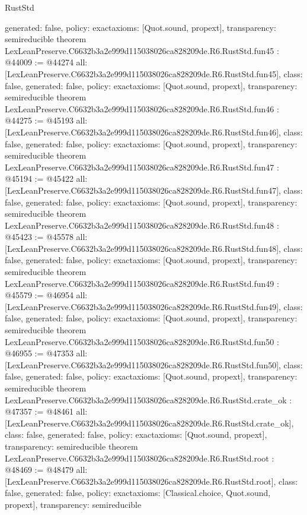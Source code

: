 \begin{lexlean}{RustStd}
\begin{coremodule}
{  generated: false,
  policy: exact{axioms: [Quot.sound, propext]},
  transparency: semireducible
}
theorem LexLeanPreserve.C6632b3a2e999d115038026ca828209de.R6.RustStd.fun45 : @44009 := @44274 {
  all: [LexLeanPreserve.C6632b3a2e999d115038026ca828209de.R6.RustStd.fun45],
  class: false,
  generated: false,
  policy: exact{axioms: [Quot.sound, propext]},
  transparency: semireducible
}
theorem LexLeanPreserve.C6632b3a2e999d115038026ca828209de.R6.RustStd.fun46 : @44275 := @45193 {
  all: [LexLeanPreserve.C6632b3a2e999d115038026ca828209de.R6.RustStd.fun46],
  class: false,
  generated: false,
  policy: exact{axioms: [Quot.sound, propext]},
  transparency: semireducible
}
theorem LexLeanPreserve.C6632b3a2e999d115038026ca828209de.R6.RustStd.fun47 : @45194 := @45422 {
  all: [LexLeanPreserve.C6632b3a2e999d115038026ca828209de.R6.RustStd.fun47],
  class: false,
  generated: false,
  policy: exact{axioms: [Quot.sound, propext]},
  transparency: semireducible
}
theorem LexLeanPreserve.C6632b3a2e999d115038026ca828209de.R6.RustStd.fun48 : @45423 := @45578 {
  all: [LexLeanPreserve.C6632b3a2e999d115038026ca828209de.R6.RustStd.fun48],
  class: false,
  generated: false,
  policy: exact{axioms: [Quot.sound, propext]},
  transparency: semireducible
}
theorem LexLeanPreserve.C6632b3a2e999d115038026ca828209de.R6.RustStd.fun49 : @45579 := @46954 {
  all: [LexLeanPreserve.C6632b3a2e999d115038026ca828209de.R6.RustStd.fun49],
  class: false,
  generated: false,
  policy: exact{axioms: [Quot.sound, propext]},
  transparency: semireducible
}
theorem LexLeanPreserve.C6632b3a2e999d115038026ca828209de.R6.RustStd.fun50 : @46955 := @47353 {
  all: [LexLeanPreserve.C6632b3a2e999d115038026ca828209de.R6.RustStd.fun50],
  class: false,
  generated: false,
  policy: exact{axioms: [Quot.sound, propext]},
  transparency: semireducible
}
theorem LexLeanPreserve.C6632b3a2e999d115038026ca828209de.R6.RustStd.crate_ok : @47357 := @48461 {
  all: [LexLeanPreserve.C6632b3a2e999d115038026ca828209de.R6.RustStd.crate_ok],
  class: false,
  generated: false,
  policy: exact{axioms: [Quot.sound, propext]},
  transparency: semireducible
}
theorem LexLeanPreserve.C6632b3a2e999d115038026ca828209de.R6.RustStd.root : @48469 := @48479 {
  all: [LexLeanPreserve.C6632b3a2e999d115038026ca828209de.R6.RustStd.root],
  class: false,
  generated: false,
  policy: exact{axioms: [Classical.choice, Quot.sound, propext]},
  transparency: semireducible
}


\end{coremodule}
\end{lexlean}
